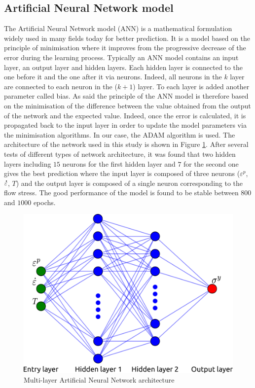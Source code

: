 \documentclass[twoside,english,1p,final,sort&compress]{elsarticle}
\theoremstyle{plain}
\newcommand{\mdot}[1]{\accentset{\mbox{\bfseries .}}{#1}}
\begin{document}
\subsection{Artificial Neural Network model\label{sec:ANNmodel}}
The Artificial Neural Network model (ANN) is a mathematical formulation widely used in many fields today for better prediction.
It is a model based on the principle of minimisation where it improves from the progressive decrease of the error during the learning process.
Typically an ANN model contains an input layer, an output layer and hidden layers.
Each hidden layer is connected to the one before it and the one after it via neurons.
Indeed, all neurons in the $k$ layer are connected to each neuron in the ($k+1$) layer.
To each layer is added another parameter called bias.
As said the principle of the ANN model is therefore based on the minimisation of the difference between the value obtained from the output of the network and the expected value.
Indeed, once the error is calculated, it is propagated back to the input layer in order to update the model parameters via the minimisation algorithms.
In our case, the ADAM algorithm is used.
The architecture of the network used in this study is shown in Figure \ref{fig:ANN-scheme-2HL}.
After several tests of different types of network architecture, it was found that two hidden layers including $15$ neurons for the first hidden layer and $7$ for the second one gives the best prediction where the input layer is composed of three neurons ($\varepsilon^p$, $\mdot\varepsilon$, $T$) and the output layer is composed of a single neuron corresponding to the flow stress.
The good performance of the model is found to be stable between $800$ and $1000$ epochs.

\begin{figure}[!ht]
\centering
\includegraphics[width=0.7\columnwidth]
{Figures/ANN-scheme-2HL}
\caption{Multi-layer Artificial Neural Network architecture}
\label{fig:ANN-scheme-2HL}
\end{figure}
\end{document}

